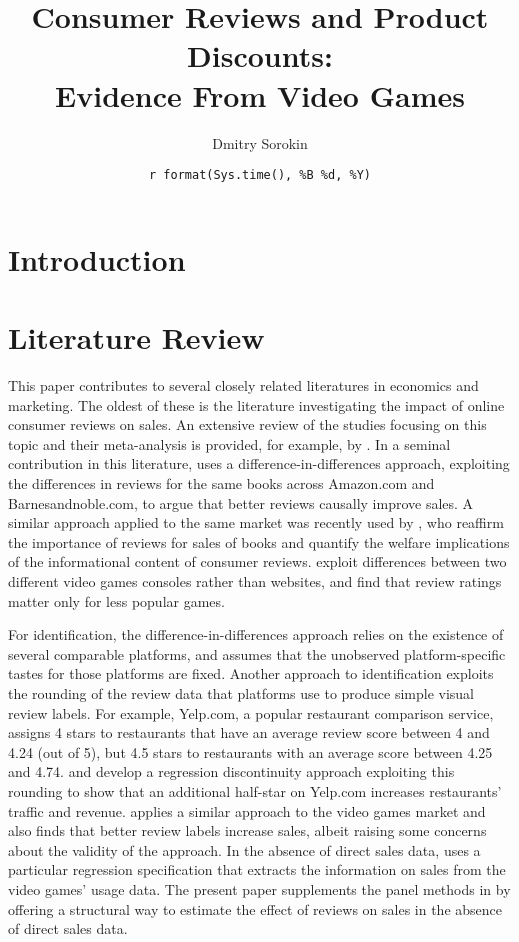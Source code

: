 \documentclass[
  12pt,
  pagebackref]{article}
\title{Consumer Reviews and Product Discounts:\\
Evidence From Video Games}
\author{Dmitry Sorokin}
\date{\texttt{r\ format(Sys.time(),\ \textquotesingle{}\%B\ \%d,\ \%Y\textquotesingle{})}}
\begin{document}
\maketitle

\hypertarget{introduction}{%
\section{Introduction}\label{introduction}}

\hypertarget{literature-review}{%
\section{Literature Review}\label{literature-review}}

This paper contributes to several closely related literatures in
economics and marketing. The oldest of these is the literature
investigating the impact of online consumer reviews on sales. An
extensive review of the studies focusing on this topic and their
meta-analysis is provided, for example, by \citet{Floyd14}. In a seminal
contribution in this literature, \citet{ChevalierMayzlin06} uses a
difference-in-differences approach, exploiting the differences in
reviews for the same books across Amazon.com and Barnesandnoble.com, to
argue that better reviews causally improve sales. A similar approach
applied to the same market was recently used by
\citet{ReimersWaldfogel20}, who reaffirm the importance of reviews for
sales of books and quantify the welfare implications of the
informational content of consumer reviews. \citet{ZhuZhang10} exploit
differences between two different video games consoles rather than
websites, and find that review ratings matter only for less popular
games.

For identification, the difference-in-differences approach relies on the
existence of several comparable platforms, and assumes that the
unobserved platform-specific tastes for those platforms are fixed.
Another approach to identification exploits the rounding of the review
data that platforms use to produce simple visual review labels. For
example, Yelp.com, a popular restaurant comparison service, assigns 4
stars to restaurants that have an average review score between 4 and
4.24 (out of 5), but 4.5 stars to restaurants with an average score
between 4.25 and 4.74. \citet{AndersonMagruder12} and \citet{Luca16}
develop a regression discontinuity approach exploiting this rounding to
show that an additional half-star on Yelp.com increases restaurants'
traffic and revenue. \citet{SorokinStevens20} applies a similar approach
to the video games market and also finds that better review labels
increase sales, albeit raising some concerns about the validity of the
approach. In the absence of direct sales data, \citet{SorokinStevens20}
uses a particular regression specification that extracts the information
on sales from the video games' usage data. The present paper supplements
the panel methods in \citet{SorokinStevens20} by offering a structural
way to estimate the effect of reviews on sales in the absence of direct
sales data.
\end{document}
